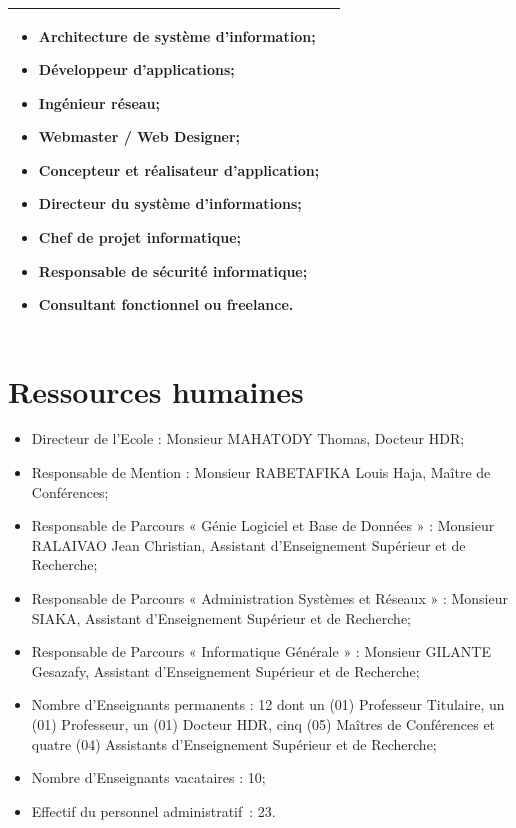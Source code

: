 \documentclass[12pt]{report}
\begin{document}
\begin{table}[h]
{\begin{tabular}{|p{5cm}|p{10cm}|}
\begin{itemize}
				        \item Architecture de système d’information;
				        \item Développeur d’applications;
				        \item Ingénieur réseau;
				        \item Webmaster / Web Designer;
				        \item Concepteur et réalisateur d’application;
				        \item Directeur du système d’informations;
				        \item Chef de projet informatique;
				        \item Responsable de sécurité informatique;
				        \item Consultant fonctionnel ou freelance.
				      \end{itemize} \\
				      \hline
				    \end{tabular}
				  }
				\end{table}
				\clearpage

				\section{Ressources humaines}
				
				\begin{itemize}
					\item Directeur de l’Ecole : Monsieur MAHATODY Thomas, Docteur HDR;
					\item Responsable de Mention : Monsieur RABETAFIKA Louis Haja, Maître de Conférences;
					\item Responsable de Parcours « Génie Logiciel et Base de Données » : Monsieur RALAIVAO Jean Christian, Assistant d’Enseignement Supérieur et de Recherche;
					\item Responsable de Parcours « Administration Systèmes et Réseaux » : Monsieur SIAKA, Assistant d’Enseignement Supérieur et de Recherche;
					\item Responsable de Parcours « Informatique Générale » : Monsieur GILANTE Gesazafy, Assistant d’Enseignement Supérieur et de Recherche;
					\item Nombre d’Enseignants permanents : 12 dont un (01) Professeur Titulaire, un (01) Professeur, un (01) Docteur HDR, cinq (05) Maîtres de Conférences et quatre (04) Assistants d’Enseignement Supérieur et de Recherche;
					\item Nombre d’Enseignants vacataires : 10;
					\item Effectif du personnel administratif : 23.
				\end{itemize}
\end{document}
